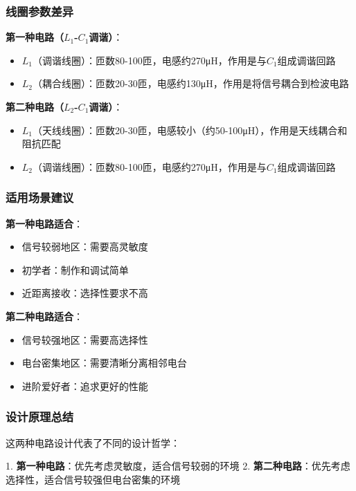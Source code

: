 \documentclass[12pt,UTF8]{ctexbook}
\begin{document}
\subsubsection{线圈参数差异}

\textbf{第一种电路（$L_1$-$C_1$调谐）}：\begin{itemize}
  \item $L_1$（调谐线圈）：匝数80-100匝，电感约270μH，作用是与$C_1$组成调谐回路
  \item $L_2$（耦合线圈）：匝数20-30匝，电感约130μH，作用是将信号耦合到检波电路\end{itemize}

\textbf{第二种电路（$L_2$-$C_1$调谐）}：\begin{itemize}
  \item $L_1$（天线线圈）：匝数20-30匝，电感较小（约50-100μH），作用是天线耦合和阻抗匹配
  \item $L_2$（调谐线圈）：匝数80-100匝，电感约270μH，作用是与$C_1$组成调谐回路\end{itemize}

\subsubsection{适用场景建议}

\textbf{第一种电路适合}：\begin{itemize}
  \item 信号较弱地区：需要高灵敏度
  \item 初学者：制作和调试简单
  \item 近距离接收：选择性要求不高\end{itemize}

\textbf{第二种电路适合}：\begin{itemize}
  \item 信号较强地区：需要高选择性
  \item 电台密集地区：需要清晰分离相邻电台
  \item 进阶爱好者：追求更好的性能\end{itemize}

\subsubsection{设计原理总结}

这两种电路设计代表了不同的设计哲学：

1. \textbf{第一种电路}：优先考虑灵敏度，适合信号较弱的环境
2. \textbf{第二种电路}：优先考虑选择性，适合信号较强但电台密集的环境
\end{document}
